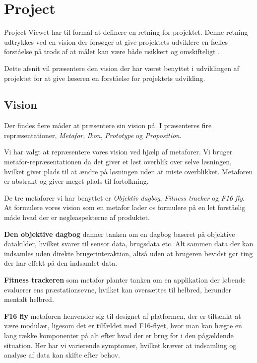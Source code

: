 \section{Project}
Project Viewet har til formål at definere en retning for projektet.
Denne retning udtrykkes ved en vision der forsøger at give projektets udviklere en fælles forståelse på trods af at målet kan være både usikkert og omskifteligt \cite[Kapitel 15 - Project]{art:essence}.

Dette afsnit vil præsentere den vision der har været benyttet i udviklingen af projektet for at give læseren en forståelse for projektets udvikling.

\subsection{Vision}
Der findes flere måder at præsentere sin vision på. 
I \citet[Kapitel 24 - Representation]{art:essence} præsenteres fire repræsentationer, \textit{Metafor}, \textit{Ikon}, \textit{Prototype} og \textit{Proposition}.

Vi har valgt at repræsentere vores vision ved hjælp af metaforer.
Vi bruger metafor-repræsentationen da det giver et løst overblik over selve løsningen, hvilket giver plads til at ændre på løsningen uden at miste overblikket. 
Metaforen er abstrakt og giver meget plads til fortolkning.

De tre metaforer vi har benyttet er \textit{Objektiv dagbog}, \textit{Fitness tracker} og \textit{F16 fly}.
At formulere vores vision som en metafor lader os formulere på en let forståelig måde hvad der er nøgleaspekterne af produktet.

\textbf{Den objektive dagbog} danner tanken om en dagbog baseret på objektive datakilder, hvilket svarer til sensor data, brugsdata etc.
Alt sammen data der kan indsamles uden direkte brugerinteraktion, altså uden at brugeren bevidst gør ting der har effekt på den indsamlet data.

\textbf{Fitness trackeren} som metafor planter tanken om en applikation der løbende evaluerer ens præstationsevne, hvilket kan oversættes til helbred, herunder mentalt helbred.

\textbf{F16 fly} metaforen henvender sig til designet af platformen, der er tiltænkt at være modulær, ligesom det er tilfældet med F16-flyet, hvor man kan hægte en lang række komponenter på alt efter hvad der er brug for i den pågældende situation.
Her har vi varierende symptomer, hvilket kræver at indsamling og analyse af data kan skifte efter behov.

